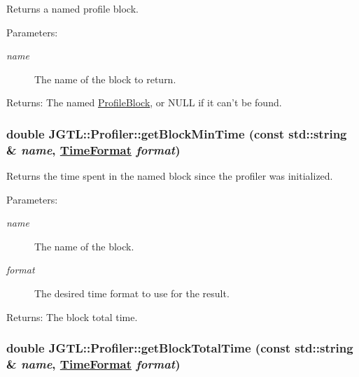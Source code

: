 Returns a named profile block.

\begin{Desc}
\item[Parameters:]
\begin{description}
\item[{\em name}]The name of the block to return. \end{description}
\end{Desc}
\begin{Desc}
\item[Returns:]The named \hyperlink{struct_j_g_t_l_1_1_profile_block}{Profile\-Block}, or NULL if it can't be found. \end{Desc}
\hypertarget{class_j_g_t_l_1_1_profiler_ee7211e4dc27568848d92ed6a66d91f9}{
\subsubsection[getBlockMinTime]{\setlength{\rightskip}{0pt plus 5cm}double JGTL::Profiler::get\-Block\-Min\-Time (const std::string \& {\em name}, \hyperlink{namespace_j_g_t_l_11a34d88ecadd1c99354adc21fd5abe6}{Time\-Format} {\em format})}}
\label{class_j_g_t_l_1_1_profiler_ee7211e4dc27568848d92ed6a66d91f9}


Returns the time spent in the named block since the profiler was initialized.

\begin{Desc}
\item[Parameters:]
\begin{description}
\item[{\em name}]The name of the block. \item[{\em format}]The desired time format to use for the result. \end{description}
\end{Desc}
\begin{Desc}
\item[Returns:]The block total time. \end{Desc}
\hypertarget{class_j_g_t_l_1_1_profiler_9ebb538c444e9e2069d46dd100a156d4}{
\subsubsection[getBlockTotalTime]{\setlength{\rightskip}{0pt plus 5cm}double JGTL::Profiler::get\-Block\-Total\-Time (const std::string \& {\em name}, \hyperlink{namespace_j_g_t_l_11a34d88ecadd1c99354adc21fd5abe6}{Time\-Format} {\em format})}}
\label{class_j_g_t_l_1_1_profiler_9ebb538c444e9e2069d46dd100a156d4}


